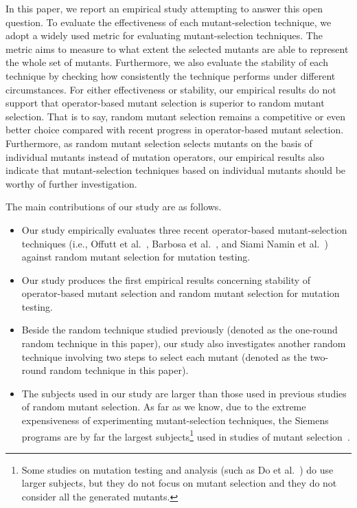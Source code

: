 In this paper, we report an empirical study attempting to answer
this open question. To evaluate the effectiveness of each
mutant-selection technique, we adopt a widely used metric for
evaluating mutant-selection techniques. The metric aims to measure
to what extent the selected mutants are able to represent the
whole set of mutants. Furthermore, we also evaluate the stability
of each technique by checking how consistently the technique
performs under different circumstances. For either effectiveness
or stability, our empirical results do not support that
operator-based mutant selection is superior to random mutant
selection. That is to say, random mutant selection remains a
competitive or even better choice compared with recent progress in
operator-based mutant selection. Furthermore, as random mutant
selection selects mutants on the basis of individual mutants
instead of mutation operators, our empirical results also indicate
that mutant-selection techniques based on individual mutants
should be worthy of further investigation.

The main contributions of our study are as follows.


\begin{itemize}
\vspace{-2ex}

\item Our study empirically evaluates three recent operator-based
mutant-selection techniques (i.e., Offutt et al.~\cite{Offutt:96},
Barbosa et al.~\cite{Barbosa:01}, and Siami Namin et
al.~\cite{SiamiNamin:08}) against random mutant selection for
mutation testing.\vspace{-2ex}

\item Our study produces the first empirical results concerning
stability of operator-based mutant selection and random mutant
selection for mutation testing. \vspace{-2ex}

\item Beside the random technique studied previously (denoted as
the one-round random technique in this paper), our study also
investigates another random technique involving two steps to
select each mutant (denoted as the two-round random technique in
this paper).\vspace{-2ex}

\item The subjects used in our study are larger than those used in
previous studies of random mutant selection. As far as we know,
due to the extreme expensiveness of experimenting mutant-selection
techniques, the Siemens programs are by far the largest
subjects\footnote{Some studies on mutation testing and analysis
(such as Do et al.~\cite{Do:06}) do use larger subjects, but they
do not focus on mutant selection and they do not consider all the
generated mutants.} used in studies of mutant
selection~\cite{SiamiNamin:08}. \vspace{-2ex}

\end{itemize}

